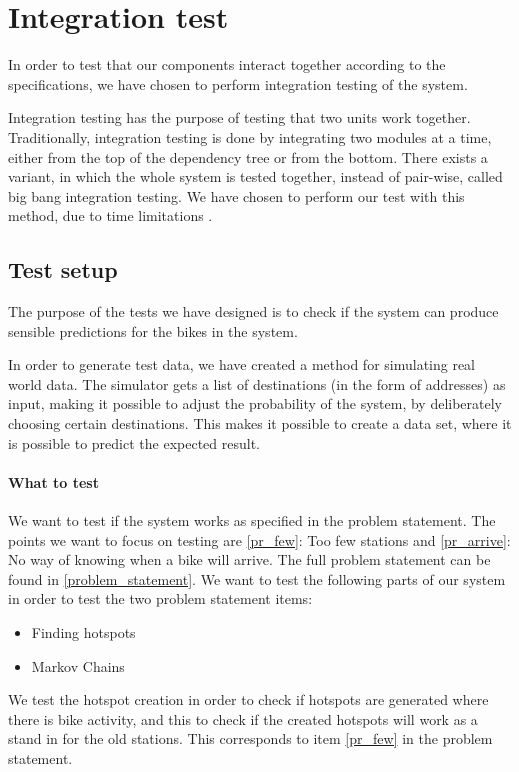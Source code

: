 \section{Integration test}

In order to test that our components interact together according to the specifications, we have chosen to perform integration testing of the system.

Integration testing has the purpose of testing that two units work together. 
Traditionally, integration testing is done by integrating two modules at a time, either from the top of the dependency tree or from the bottom.
There exists a variant, in which the whole system is tested together, instead of pair-wise, called big bang integration testing.
We have chosen to perform our test with this method, due to time limitations \cite{inttest}.

\subsection{Test setup}
The purpose of the tests we have designed is to check if the system can produce sensible predictions for the bikes in the system.

In order to generate test data, we have created a method for simulating real world data. 
The simulator gets a list of destinations (in the form of addresses) as input, making it possible to adjust the probability of the system, by deliberately choosing certain destinations.
This makes it possible to create a data set, where it is possible to predict the expected result.

\paragraph{What to test}
We want to test if the system works as specified in the problem statement.
The points we want to focus on testing are \ref{pr_few}: Too few stations and \ref{pr_arrive}: No way of knowing when a bike will arrive. 
The full problem statement can be found in \cref{problem_statement}.
We want to test the following parts of our system in order to test the two problem statement items:

\begin{itemize}
\item Finding hotspots 
\item Markov Chains
\end{itemize}

We test the hotspot creation in order to check if hotspots are generated where there is bike activity, and this to check if the created hotspots will work as a stand in for the old stations.
This corresponds to item \ref{pr_few} in the problem statement.


